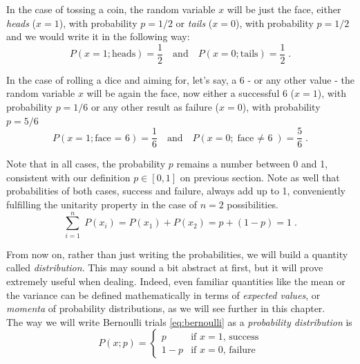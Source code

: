 \documentclass{book}
\begin{document}
In the case of tossing a coin, the random variable $x$ will be just the face, either \textit{heads} ($x = 1$), with probability $p = 1/2$ or \textit{tails} ($x = 0$), with probability $p = 1/2$ and we would write it in the following way:
\begin{equation}
	P(x = 1; \text{heads}) = \frac{1}{2} \quad \text{and} \quad P(x = 0; \text{tails}) = \frac{1}{2} \; .
	\label{eq:bernoulli_1}
\end{equation}

In the case of rolling a dice and aiming for, let's say, a 6 - or any other value - the random variable $x$ will be again the face, now either a successful 6 ($x = 1$), with probability $p = 1/6$ or any other result as failure ($x = 0$), with probability $p = 5/6$
\begin{equation}
	P(x = 1; \text{face = 6}) = \frac{1}{6} \quad \text{and} \quad P(x = 0; \text{face $\neq$ 6}) = \frac{5}{6} \; .
	\label{eq:bernoulli_2}
\end{equation}

Note that in all cases, the probability $p$ remains a number between 0 and 1, consistent with our definition $p \in [0, 1]$ on previous section. Note as well that probabilities of both cases, success and failure, always add up to 1, conveniently fulfilling the unitarity property in the case of $n = 2$ possibilities.
\begin{equation}
	\sum_{i = 1}^{n} \; P(x_{i}) = P(x_1) + P(x_2) = p + (1 - p) = 1 \; .
\end{equation}

From now on, rather than just writing the probabilities, we will build a quantity called \textit{distribution}. This may sound a bit abstract at first, but it will prove extremely useful when dealing. Indeed, even familiar quantities like the mean or the variance can be defined mathematically in terms of \textit{expected values}, or \textit{momenta} of probability distributions, as we will see further in this chapter.\\

The way we will write Bernoulli trials \eqref{eq:bernoulli} as a \textit{probability distribution} is 
\begin{equation}
	P(x; p) = 
		\begin{cases}
			p & \text{if $x = 1$, success} \\
			1 - p & \text{if $x = 0$, failure}
		\end{cases}
\end{equation}
\end{document}

